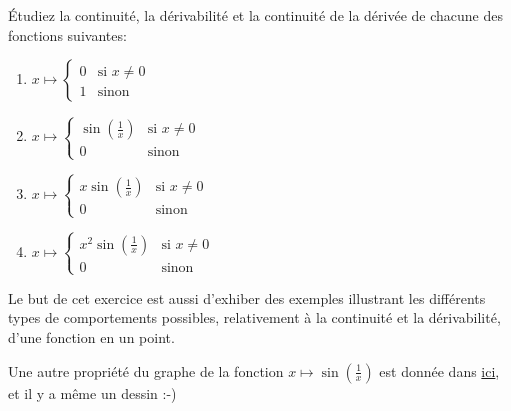 
\begin{exercice}\label{exo0035}


Étudiez la continuité, la dérivabilité et la continuité de la dérivée de chacune des fonctions suivantes:
\begin{enumerate}
	\item $x \mapsto \left\{ \begin{array}{ll} 0 & \mbox{si } x \not= 0 \\ 1 & \mbox{sinon} \end{array} \right.  $
	\item $x \mapsto \left\{ \begin{array}{ll} \sin(\frac{1}{x}) & \mbox{si } x \not= 0 \\ 0 & \mbox{sinon} \end{array} \right.  $
	\item $x \mapsto \left\{ \begin{array}{ll} x \sin(\frac{1}{x}) & \mbox{si } x \not= 0 \\ 0 & \mbox{sinon} \end{array} \right. $
	\item\label{Item0035d} $x \mapsto \left\{ \begin{array}{ll} x^2 \sin(\frac{1}{x}) & \mbox{si } x \not= 0 \\ 0 & \mbox{sinon} \end{array} \right.  $
\end{enumerate}
Le but de cet exercice est aussi d'exhiber des exemples illustrant les différents types de comportements possibles, relativement à la continuité et la dérivabilité, d'une fonction en un point.

Une autre propriété du graphe de la fonction $x\mapsto \sin(\frac{1}{ x })$ est donnée dans \href{http://student.ulb.ac.be/~lclaesse/exMATH1241.pdf}{ici}, et il y a même un dessin :-)

\end{exercice}
